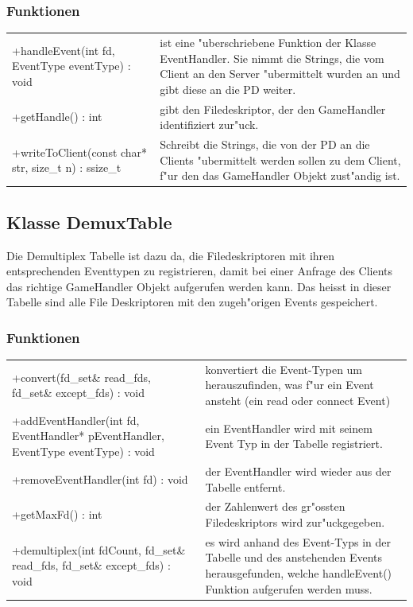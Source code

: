 \subsubsection{Funktionen}
\begin{tabular}{p{50mm}p{90mm}}
	+handleEvent(int fd, EventType eventType) : void & ist eine "uberschriebene Funktion der Klasse EventHandler. Sie nimmt die
	Strings, die vom Client an den Server "ubermittelt wurden an und gibt diese an die PD weiter. \\
	+getHandle() : int & gibt den Filedeskriptor, der den GameHandler identifiziert zur"uck. \\
	+writeToClient(const char* str, size\_t n) : ssize\_t & Schreibt die Strings, die von der PD an die Clients "ubermittelt werden sollen zu dem
	Client, f"ur den das GameHandler Objekt zust"andig ist. \\
\end{tabular}

\subsection{Klasse DemuxTable}
Die Demultiplex Tabelle ist dazu da, die Filedeskriptoren mit ihren entsprechenden Eventtypen zu registrieren, 
damit bei einer Anfrage des Clients das richtige GameHandler Objekt
aufgerufen werden kann. Das heisst in dieser Tabelle sind alle File Deskriptoren mit den zugeh"origen Events gespeichert.
\subsubsection{Funktionen}
\begin{tabular}{p{50mm}p{90mm}}
	+convert(fd\_set\& read\_fds, fd\_set\& except\_fds) : void & konvertiert die Event-Typen um herauszufinden, was f"ur ein Event ansteht 
	(ein read oder connect Event)\\
	+addEventHandler(int fd, EventHandler* pEventHandler, EventType eventType) : void & ein EventHandler wird mit seinem Event Typ 
	in der Tabelle registriert.\\
	+removeEventHandler(int fd) : void & der EventHandler wird wieder aus der Tabelle entfernt.\\
	+getMaxFd() : int & der Zahlenwert des gr"ossten Filedeskriptors wird zur"uckgegeben.\\
	+demultiplex(int fdCount, fd\_set\& read\_fds, fd\_set\& except\_fds) : void & es wird anhand des Event-Typs in der Tabelle
	und des anstehenden Events herausgefunden, welche handleEvent() Funktion aufgerufen werden muss.\\
\end{tabular}

